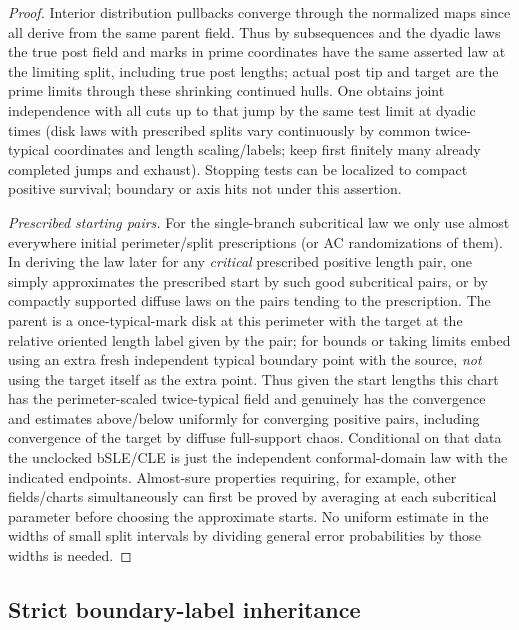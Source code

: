 \begin{proof}
Interior distribution pullbacks converge through the normalized maps since all derive from the same parent field.
Thus by subsequences and the dyadic laws the true post field and marks in prime coordinates have the same asserted law at the limiting split, including true post lengths; actual post tip and target are the prime limits through these shrinking continued hulls.
One obtains joint independence with all cuts up to that jump by the same test limit at dyadic times (disk laws with prescribed splits vary continuously by common twice-typical coordinates and length scaling/labels; keep first finitely many already completed jumps and exhaust).
Stopping tests can be localized to compact positive survival; boundary or axis hits not under this assertion.

\smallskip\noindent\textit{Prescribed starting pairs.}\quad
For the single-branch subcritical law we only use almost everywhere initial perimeter/split prescriptions (or AC randomizations of them).
In deriving the law later for any \emph{critical} prescribed positive length pair, one simply approximates the prescribed start by such good subcritical pairs, or by compactly supported diffuse laws on the pairs tending to the prescription.
The parent is a once-typical-mark disk at this perimeter with the target at the relative oriented length label given by the pair; for bounds or taking limits embed using an extra fresh independent typical boundary point with the source, \emph{not} using the target itself as the extra point.
Thus given the start lengths this chart has the perimeter-scaled twice-typical field and genuinely has the convergence and estimates above/below uniformly for converging positive pairs, including convergence of the target by diffuse full-support chaos.
Conditional on that data the unclocked bSLE/CLE is just the independent conformal-domain law with the indicated endpoints.
Almost-sure properties requiring, for example, other fields/charts simultaneously can first be proved by averaging at each subcritical parameter before choosing the approximate starts.
No uniform estimate in the widths of small split intervals by dividing general error probabilities by those widths is needed.

\end{proof}

\subsection{Strict boundary-label inheritance}\label{proxy:strict-stack}

